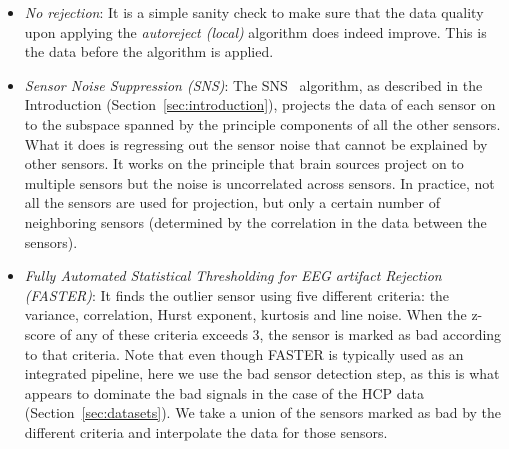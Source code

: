 \begin{itemize}[noitemsep,nolistsep]
\item \emph{No rejection}: It is a simple sanity check to make sure that the data quality upon applying the \emph{autoreject (local)} algorithm does indeed improve. This is the data before the algorithm is applied.
\item \emph{Sensor Noise Suppression (SNS)}: The SNS~\citep{de2008sensor} algorithm, as described in the Introduction (Section~\ref{sec:introduction}), projects the data of each sensor on to the subspace spanned by the principle components of all the other sensors. What it does is regressing out the sensor noise that cannot be explained by other sensors. It works on the principle that brain sources project on to multiple sensors but the noise is uncorrelated across sensors. In practice, not all the sensors are used for projection, but only a certain number of neighboring sensors (determined by the correlation in the data between the sensors).
\item \emph{Fully Automated Statistical Thresholding for EEG artifact Rejection (FASTER)}: It finds the outlier sensor using five different criteria: the variance, correlation, Hurst exponent, kurtosis and line noise. When the z-score of any of these criteria exceeds 3, the sensor is marked as bad according to that criteria. Note that even though FASTER is typically used as an integrated pipeline, here we use the bad sensor detection step, as this is what appears to dominate the bad signals in the case of the HCP data (Section~\ref{sec:datasets}). We take a union of the sensors marked as bad by the different criteria and interpolate the data for those sensors.

\end{itemize}
